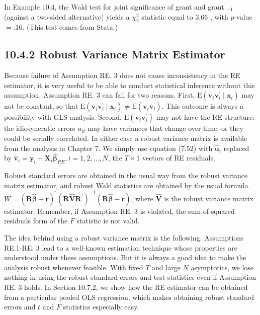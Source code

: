 \documentclass[10pt]{article}
\begin{document}
In Example 10.4, the Wald test for joint significance of grant and grant $_{-1}$ (against a two-sided alternative) yields a $\chi_{2}^{2}$ statistic equal to 3.66 , with $p$-value $=.16$. (This test comes from Stata.)

\subsection*{10.4.2 Robust Variance Matrix Estimator}
Because failure of Assumption RE. 3 does not cause inconsistency in the RE estimator, it is very useful to be able to conduct statistical inference without this assumption. Assumption RE. 3 can fail for two reasons. First, $\mathrm{E}\left(\mathbf{v}_{i} \mathbf{v}_{i}^{\prime} \mid \mathbf{x}_{i}\right)$ may not be constant, so that $\mathrm{E}\left(\mathbf{v}_{i} \mathbf{v}_{i}^{\prime} \mid \mathbf{x}_{i}\right) \neq \mathrm{E}\left(\mathbf{v}_{i} \mathbf{v}_{i}^{\prime}\right)$. This outcome is always a possibility with GLS analysis. Second, $\mathrm{E}\left(\mathbf{v}_{i} \mathbf{v}_{i}^{\prime}\right)$ may not have the RE structure: the idiosyncratic errors $u_{i t}$ may have variances that change over time, or they could be serially correlated. In either case a robust variance matrix is available from the analysis in Chapter 7. We simply use equation (7.52) with $\hat{\mathbf{u}}_{i}$ replaced by $\hat{\mathbf{v}}_{i}=\mathbf{y}_{i}-\mathbf{X}_{i} \hat{\boldsymbol{\beta}}_{R E}, i=1,2, \ldots, N$, the $T \times 1$ vectors of RE residuals.

Robust standard errors are obtained in the usual way from the robust variance matrix estimator, and robust Wald statistics are obtained by the usual formula $W= (\mathbf{R} \hat{\boldsymbol{\beta}}-\mathbf{r})^{\prime}\left(\mathbf{R} \hat{\mathbf{V}} \mathbf{R}^{\prime}\right)^{-1}(\mathbf{R} \hat{\boldsymbol{\beta}}-\mathbf{r})$, where $\hat{\mathbf{V}}$ is the robust variance matrix estimator. Remember, if Assumption RE. 3 is violated, the sum of squared residuals form of the $F$ statistic is not valid.

The idea behind using a robust variance matrix is the following. Assumptions RE.1-RE. 3 lead to a well-known estimation technique whose properties are understood under these assumptions. But it is always a good idea to make the analysis robust whenever feasible. With fixed $T$ and large $N$ asymptotics, we lose nothing in using the robust standard errors and test statistics even if Assumption RE. 3 holds. In Section 10.7.2, we show how the RE estimator can be obtained from a particular pooled OLS regression, which makes obtaining robust standard errors and $t$ and $F$ statistics especially easy.
\end{document}

